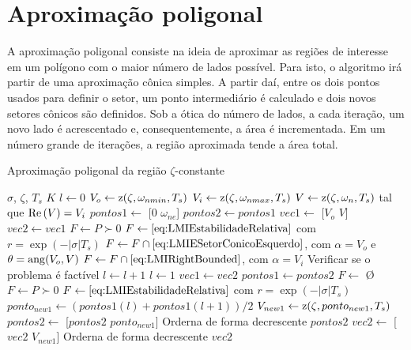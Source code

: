 \section{Aproximação poligonal}
A aproximação poligonal consiste na ideia de aproximar as regiões de interesse em um polígono com o maior número de lados possível. Para isto, o algoritmo irá partir de uma aproximação cônica simples. A partir daí, entre os dois pontos usados para definir o setor, um ponto intermediário é calculado e dois novos setores cônicos são definidos.
Sob a ótica do número de lados, a cada iteração, um novo lado é acrescentado e, consequentemente, a área é incrementada. Em um número grande de iterações, a região aproximada tende a área total.
\begin{algorithm}[ht!]
  \caption{Aproximação poligonal da região $\zeta$-constante}\label{alg:AproximacaoPoligonalZeta}
  \begin{algorithmic}[1]
    \Require $\sigma$, $\zeta$, $T_s$
    \Ensure $K$
    \State $l \gets 0$
    \State $V_o \gets \operatorname{\mathrm{z}}(\zeta,\omega_{nmin},T_s)$
    \State $V_i \gets \operatorname{\mathrm{z}}(\zeta,\omega_{nmax},T_s)$
    \State $V \gets \operatorname{\mathrm{z}}(\zeta,\omega_n,T_s)$ tal que $\operatorname{Re}{(V)} = V_i$
    \State $pontos1 \gets$ [$0$ $\omega_{ne}$]
    \State $pontos2 \gets pontos1$
    \State $vec1 \gets$ [$V_o$ $V$]
    \State $vec2 \gets vec1$
    \State $F \gets P \succ 0$
    \State $F \gets \eqref{eq:LMIEstabilidadeRelativa}$ com $r = \exp{\left(-|\sigma|T_s\right)}$ 
    \State $F \gets F \cap \eqref{eq:LMIESetorConicoEsquerdo}$, com $\alpha = V_o$ e $\theta = \operatorname{ang}(V_o,V)$ 
    \State $F \gets F \cap \eqref{eq:LMIRightBounded}$, com $\alpha = V_i$ 
    \State Verificar se o problema é factível
        \State $l \gets l + 1$
      \Else
        \State $l \gets 1$
        \State $vec1 \gets vec2$
        \State $pontos1 \gets pontos2$
      \EndIf
        \State $F \gets$ \O {}
        \State $F \gets P \succ 0$
        \State $F \gets \eqref{eq:LMIEstabilidadeRelativa}$ com $r = \exp{\left(-|\sigma|T_s\right)}$ 
        \State $ponto_{new1} \gets (pontos1(l)+pontos1(l+1))/2$
        \State $V_{new1} \gets \operatorname{\mathrm{z}}(\zeta, ponto_{new1}, T_s)$
        \State $pontos2 \gets$ [$pontos2$ $ponto_{new1}$]
        \State Orderna de forma decrescente $pontos2$
        \State $vec2 \gets$ [$vec2$ $V_{new1}$]
        \State Orderna de forma decrescente $vec2$

\end{algorithmic}
\end{algorithm}
